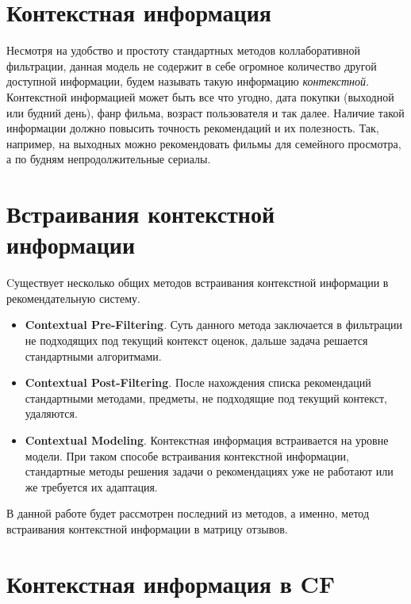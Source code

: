 
\section{Контекстная информация}

Несмотря на удобство и простоту стандартных методов коллаборативной фильтрации, данная модель не содержит в себе огромное количество другой доступной информации, будем называть такую информацию \textit{контекстной}. Контекстной информацией может быть все что угодно, дата покупки (выходной или будний день), фанр фильма, возраст пользователя и так далее. Наличие такой информации должно повысить точность рекомендаций и их полезность. Так, например, на выходных можно рекомендовать фильмы для семейного просмотра, а по будням непродолжительные сериалы.

\section{Встраивания контекстной информации}

Cуществует несколько общих методов встраивания контекстной информации в рекомендательную систему.

\begin{itemize}
\item \textbf{Contextual Pre-Filtering}. Суть данного метода заключается в фильтрации не подходящих под текущий контекст оценок, дальше задача решается стандартными алгоритмами.

\item \textbf{Contextual Post-Filtering}. После нахождения списка рекомендаций стандартными методами, предметы, не подходящие под текущий контекст, удаляются.

\item \textbf{Contextual Modeling}. Контекстная информация встраивается на уровне модели. При таком способе встраивания контекстной информации, стандартные методы решения задачи о рекомендациях уже не работают или же требуется их адаптация.

\end{itemize}

В данной работе будет рассмотрен последний из методов, а именно, метод встраивания контекстной информации в матрицу отзывов.

\section{Контекстная информация в CF}

